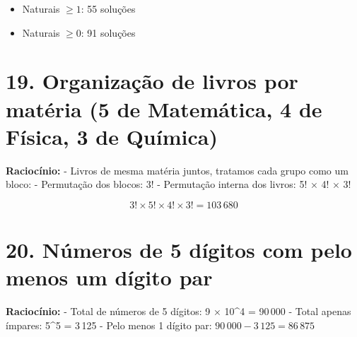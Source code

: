 \documentclass[12pt,a4paper]{article}
\begin{document}
\begin{itemize}
    \item Naturais $\ge 1$: 55 soluções  
    \item Naturais $\ge 0$: 91 soluções
\end{itemize}

\section*{19. Organização de livros por matéria (5 de Matemática, 4 de Física, 3 de Química)}

\textbf{Raciocínio:}  
- Livros de mesma matéria juntos, tratamos cada grupo como um bloco:  
- Permutação dos blocos: 3!  
- Permutação interna dos livros: 5! × 4! × 3!  

\[
3! \times 5! \times 4! \times 3! = 103\,680
\]

\section*{20. Números de 5 dígitos com pelo menos um dígito par}

\textbf{Raciocínio:}  
- Total de números de 5 dígitos: 9 × 10^4 = 90\,000  
- Total apenas ímpares: 5^5 = 3\,125  
- Pelo menos 1 dígito par: \(90\,000 - 3\,125 = 86\,875\)
\end{document}

